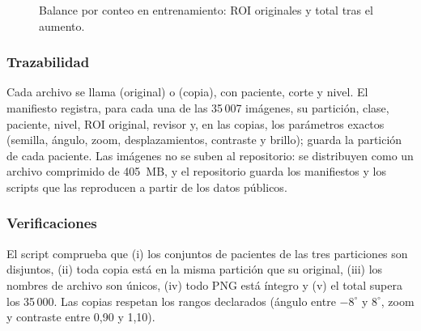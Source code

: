 \begin{figure}[!htb]
\centering
{}
\caption{Balance por conteo en entrenamiento: ROI originales y total tras el aumento.}
\label{fig:balance}
\end{figure}

\subsubsection{Trazabilidad}
Cada archivo se llama  (original) o  (copia), con paciente, corte y nivel. El manifiesto  registra, para cada una de las 35\,007 imágenes, su partición, clase, paciente, nivel, ROI original, revisor y, en las copias, los parámetros exactos (semilla, ángulo, zoom, desplazamientos, contraste y brillo);  guarda la partición de cada paciente. Las imágenes no se suben al repositorio: se distribuyen como un archivo comprimido de 405~MB, y el repositorio guarda los manifiestos y los scripts que las reproducen a partir de los datos públicos.

\subsubsection{Verificaciones}
El script comprueba que (i) los conjuntos de pacientes de las tres particiones son disjuntos, (ii) toda copia está en la misma partición que su original, (iii) los nombres de archivo son únicos, (iv) todo PNG está íntegro y (v) el total supera los 35\,000. Las copias respetan los rangos declarados (ángulo entre $-8^{\circ}$ y $8^{\circ}$, zoom y contraste entre 0,90 y 1,10).

